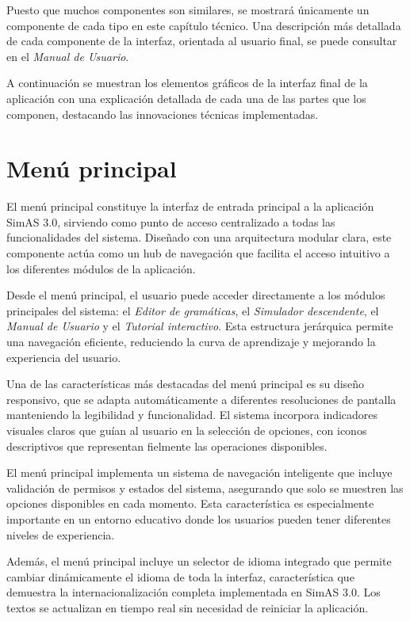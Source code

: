 Puesto que muchos componentes son similares, se mostrará únicamente un componente de cada tipo en este capítulo técnico. Una descripción más detallada de cada componente de la interfaz, orientada al usuario final, se puede consultar en el \textit{Manual de Usuario}.

A continuación se muestran los elementos gráficos de la interfaz final de la aplicación con una explicación detallada de cada una de las partes que los componen, destacando las innovaciones técnicas implementadas.

\section{Menú principal}

El menú principal constituye la interfaz de entrada principal a la aplicación SimAS 3.0, sirviendo como punto de acceso centralizado a todas las funcionalidades del sistema. Diseñado con una arquitectura modular clara, este componente actúa como un hub de navegación que facilita el acceso intuitivo a los diferentes módulos de la aplicación.

Desde el menú principal, el usuario puede acceder directamente a los módulos principales del sistema: el \textit{Editor de gramáticas}, el \textit{Simulador descendente}, el \textit{Manual de Usuario} y el \textit{Tutorial interactivo}. Esta estructura jerárquica permite una navegación eficiente, reduciendo la curva de aprendizaje y mejorando la experiencia del usuario.

Una de las características más destacadas del menú principal es su diseño responsivo, que se adapta automáticamente a diferentes resoluciones de pantalla manteniendo la legibilidad y funcionalidad. El sistema incorpora indicadores visuales claros que guían al usuario en la selección de opciones, con iconos descriptivos que representan fielmente las operaciones disponibles.

El menú principal implementa un sistema de navegación inteligente que incluye validación de permisos y estados del sistema, asegurando que solo se muestren las opciones disponibles en cada momento. Esta característica es especialmente importante en un entorno educativo donde los usuarios pueden tener diferentes niveles de experiencia.

Además, el menú principal incluye un selector de idioma integrado que permite cambiar dinámicamente el idioma de toda la interfaz, característica que demuestra la internacionalización completa implementada en SimAS 3.0. Los textos se actualizan en tiempo real sin necesidad de reiniciar la aplicación.

